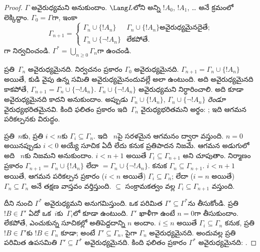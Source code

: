 \documentclass[../../../include/open-logic-section]{subfiles}
\begin{document}
\begin{proof}
$\Gamma$ అవైరుధ్యమని అనుకుందాం. $\Lang L$లోని అన్ని 
$!A_0$, $!A_1$, \dots{} అనే క్రమంలో లెక్కిద్దాం. $\Gamma_0 =
\Gamma$గా, ఇంకా
\[
\Gamma_{n+1} =
\begin{cases}
\Gamma_n \cup \{ !A_n \} & \textrm{$\Gamma_n \cup \{!A_n\}$
  అవైరుధ్యమైనదైతే;} \\
\Gamma_n \cup \{ \lnot !A_n \} & \textrm{లేకపోతే.}
\end{cases}
\]
గా నిర్వచించండి. $\Gamma^* = \bigcup_{n \geq 0} \Gamma_n$గా ఉంచండి.

ప్రతి~$\Gamma_n$ అవైరుధ్యమైనది. నిర్వచనం ప్రకారం $\Gamma_0$
అవైరుధ్యమైనది. $\Gamma_{n+1} = \Gamma_n \cup \{!A_n\}$ అయితే,
కుడి వైపు ఉన్న సమితి అవైరుధ్యమైనందువల్లే అలా ఉంటుంది. అది అవైరుధ్యమైనది కాకపోతే,
$\Gamma_{n+1} = \Gamma_n \cup \{\lnot !A_n\}$. $\Gamma_n \cup
\{\lnot !A_n\}$ అవైరుధ్యమని నిర్ధారించాలి. అది కూడా అవైరుధ్యమైనది కాదని
అనుకుందాం. అప్పుడు $\Gamma_n \cup \{!A_n\}$, $\Gamma_n \cup
\{\lnot !A_n\}$
\emph{రెండూ} వైరుధ్యభరితమైనవి. కింది ఫలితం ప్రకారం ఇది~$\Gamma_n$
వైరుధ్యభరితమని అర్థం:
;
ఇది ఆగమన పరికల్పనకు విరుద్ధం.

ప్రతి~$n$కు, ప్రతి $i < n$కు $\Gamma_i \subseteq \Gamma_n$. ఇది
~$n$పై సరళమైన ఆగమనం ద్వారా వస్తుంది. $n=0$ అయినప్పుడు $i < 0$
అయ్యే సూచిక ఏదీ లేదు కనుక ప్రతిపాదన నిజమే. ఆగమన అడుగులో అది
~$n$కు నిజమని అనుకుందాం. $i < n+1$ అయితే $\Gamma_i \subseteq
\Gamma_{n+1}$ అని చూపుతాం. నిర్మాణం ప్రకారం $\Gamma_{n+1} = \Gamma_n
\cup \{!A_n\}$ లేదా $= \Gamma_n \cup \{\lnot !A_n\}$. కనుక
$\Gamma_n \subseteq \Gamma_{n+1}$. $i < n+1$ అయితే, ఆగమన పరికల్పన
ప్రకారం ($i < n$ అయితే) $\Gamma_i \subseteq \Gamma_n$; లేదా ($i = n$
అయితే) $\Gamma_n \subseteq \Gamma_n$ అనే తక్షణ వాస్తవం వర్తిస్తుంది.
$\subseteq$ సంక్రామకత్వం వల్ల $\Gamma_i \subseteq
\Gamma_{n+1}$ వస్తుంది.

దీని నుంచి $\Gamma^*$ అవైరుధ్యమని అనుగమిస్తుంది. ఒక పరిమిత
$\Gamma' \subseteq \Gamma^*$ను తీసుకోండి. ప్రతి $!B \in \Gamma'$
ఏదో ఒక~$i$కు~$\Gamma_i$లో కూడా ఉంటుంది. $\Gamma'$ ఖాళీగా ఉంటే $n=0$గా
తీసుకుందాం. లేకపోతే, ఎంచుకున్న సూచికల్లో అతిపెద్దదాన్ని $n$ అందాం. $i \le n$ అయితే $\Gamma_i \subseteq \Gamma_n$ కనుక, ప్రతి
$!B \in \Gamma'$కు $!B \in \Gamma_n$ కూడా; అంటే $\Gamma' \subseteq
\Gamma_n$, పైగా $\Gamma_n$ అవైరుధ్యమైనది.
 అందువల్ల ప్రతి పరిమిత
ఉపసమితి $\Gamma' \subseteq \Gamma^*$ అవైరుధ్యమైనది. కింది ఫలితం
ప్రకారం $\Gamma^*$ అవైరుధ్యమైనది:
.


\end{proof}
\end{document}
